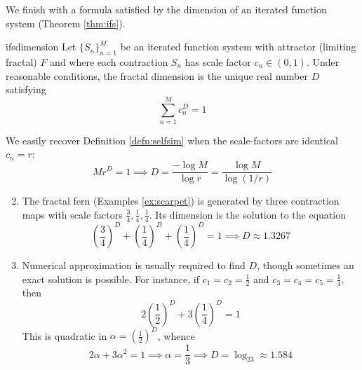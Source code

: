 \goodbreak


We finish with a formula satisfied by the dimension of an iterated function system (Theorem \ref{thm:ifs}).

\begin{thm}{}{ifsdimension}
	Let $\{S_n\}_{n=1}^M$ be an iterated function system with attractor (limiting fractal) $F$ and where each contraction $S_n$ has scale factor $c_n\in(0,1)$. Under reasonable conditions,\footnotemark{} the fractal dimension is the unique real number $D$ satisfying
	\[
		\sum_{n=1}^Mc_n^D=1
	\]
\end{thm}



\begin{examples}{}{}
	\exstart We easily recover Definition \ref{defn:selfsim} when the scale-factors are identical $c_n=r$:
	\[
		Mr^D=1\implies D=\frac{-\log M}{\log r}=\frac{\log M}{\log (1/r)}
	\]
	\begin{enumerate}\setcounter{enumi}{1}
	  \item The fractal fern (Examples \ref{ex:scarpet}) is generated by three contraction maps with scale factors $\frac 34,\frac 14,\frac 14$. Its dimension is the solution to the equation
	  \[
	  	\left(\frac 34\right)^D+\left(\frac 14\right)^D+\left(\frac 14\right)^D=1\implies D\approx 1.3267
	  \]
	  \item Numerical approximation is usually required to find $D$, though sometimes an exact solution is possible. For instance, if $c_1=c_2=\frac 12$ and $c_3=c_4=c_5=\frac 14$, then
	  \[
	  	2\left(\frac 12\right)^D+3\left(\frac 14\right)^D=1
	  \]
	  This is quadratic in $\alpha=\left(\frac 12\right)^D$, whence
	  \[
	  	2\alpha+3\alpha^2=1\implies \alpha=\frac 13\implies D=\log_23\approx 1.584
	  \]
	\end{enumerate}
\end{examples}


